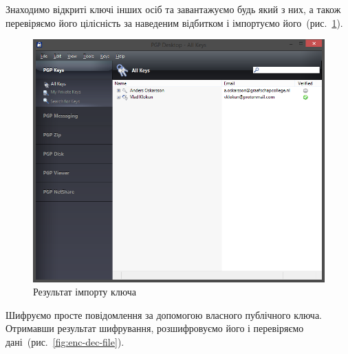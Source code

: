 \documentclass[
	a4paper,
	oneside,
	BCOR = 10mm,
	DIV = 12,
	12pt,
	headings = normal,
]{scrartcl}
\newlength{\gridunitwidth}
\begin{document}
		Знаходимо відкриті ключі інших осіб та завантажуємо будь який з них, а також перевіряємо його цілісність за наведеним відбитком і імпортуємо його~(рис.~\ref{fig:pk-import}).

		\begin{figure}[!htbp]
			\centering
			\includegraphics[width = 6\gridunitwidth]{./assets/p08.png}
			\caption{Результат імпорту ключа}
			\label{fig:pk-import}
		\end{figure}

		Шифруємо просте повідомлення за допомогою власного публічного ключа. Отримавши результат шифрування, розшифровуємо його і перевіряємо дані~(рис.~\ref{fig:enc-dec-file}).
\end{document}
